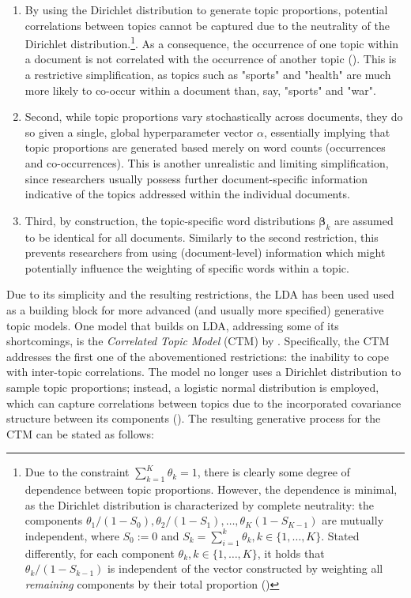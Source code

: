 \begin{enumerate}[label=(\roman*)]
\vspace{-0.25cm}
\item By using the Dirichlet distribution to generate topic proportions, potential correlations between topics cannot be captured due to the neutrality of the Dirichlet distribution.\footnote{Due to the constraint $\sum_{k=1}^{K}\theta_{k}=1$, there is clearly some degree of dependence between topic proportions. However, the dependence is minimal, as the Dirichlet distribution is characterized by complete neutrality: the components $\theta_1/(1-S_0), \theta_2/(1-S_1),\dots, \theta_K(1-S_{K-1})$ are mutually independent, where $S_0:=0$ and $S_k = \sum_{i=1}^{k}\theta_k, k \in \{1,\dots,K\}$. Stated differently, for each component $\theta_k, k \in \{1,\dots,K\}$, it holds that $\theta_k/(1-S_{k-1})$ is independent of the vector constructed by weighting all \textit{remaining} components by their total proportion (\citealp{james1980new})}. As a consequence, the occurrence of one topic within a document is not correlated with the occurrence of another topic (\citealp{blei2007correlated}). This is a restrictive simplification, as topics such as "sports" and "health" are much more likely to co-occur within a document than, say, "sports" and "war".
\vspace{-0.25cm}
\item Second, while topic proportions vary stochastically across documents, they do so given a single, global hyperparameter vector $\alpha$, essentially implying that topic proportions are generated based merely on word counts (occurrences and co-occurrences). This is another unrealistic and limiting simplification, since researchers usually possess further document-specific information indicative of the topics addressed within the individual documents.
\vspace{-0.25cm}
\item Third, by construction, the topic-specific word distributions $\boldsymbol{\beta}_k$ are assumed to be identical for all documents. Similarly to the second restriction, this prevents researchers from using (document-level) information which might potentially influence the weighting of specific words within a topic.

\end{enumerate}

\noindent
Due to its simplicity and the resulting restrictions, the LDA has been used used as a building block for more advanced (and usually more specified) generative topic models. One model that builds on LDA, addressing some of its shortcomings, is the \textit{Correlated Topic Model} (CTM) by \cite{blei2007correlated}. Specifically, the CTM addresses the first one of the abovementioned restrictions: the inability to cope with inter-topic correlations. The model no longer uses a Dirichlet distribution to sample topic proportions; instead, a logistic normal distribution is employed, which can capture correlations between topics due to the incorporated covariance structure between its components (\citealp{atchison1980logistic}). The resulting generative process for the CTM can be stated as follows:

